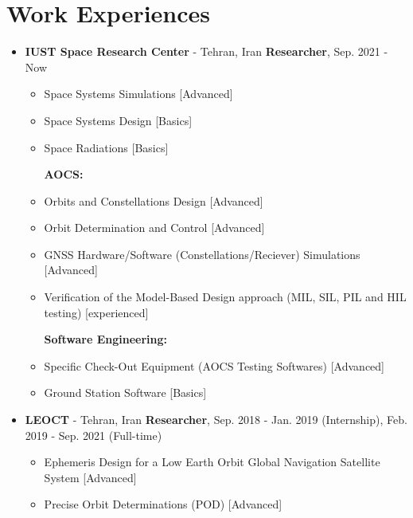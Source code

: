 \documentclass[10pt,a4paper,times]{moderncv}
\begin{document}
\section{Work Experiences}
\begin{itemize}
	\item \textbf{IUST Space Research Center} - Tehran, Iran \hfill \textbf{Researcher}, Sep. 2021 - Now \vspace{6 pt}
	\begin{itemize}
	\textbf{Space Mission Engineering:}	
	\item Space Systems Simulations [Advanced]
	\item Space Systems Design [Basics]
	\item Space Radiations [Basics] \vspace{6 pt}
	
	\textbf{AOCS:}	
	\item Orbits and Constellations Design [Advanced] 
	\item Orbit Determination and Control [Advanced]
	\item GNSS Hardware/Software (Constellations/Reciever) Simulations [Advanced]
	\item Verification of the Model-Based Design approach (MIL, SIL, PIL and HIL testing) [experienced] \vspace{6 pt}
	
	\textbf{Software Engineering:}	
	\item Specific Check-Out Equipment (AOCS Testing Softwares) [Advanced]
	\item Ground Station Software [Basics] \vspace{6 pt}
	\end{itemize} 
	\item \textbf{LEOCT} - Tehran, Iran \hfill \textbf{Researcher}, Sep. 2018 - Jan. 2019 (Internship), Feb. 2019 - Sep. 2021 (Full-time) \vspace{6 pt}
	\begin{itemize}
	\item Ephemeris Design for a Low Earth Orbit Global Navigation Satellite System [Advanced]
	\item Precise Orbit Determinations (POD) [Advanced]
	\end{itemize}
\end{itemize}
\end{document}
